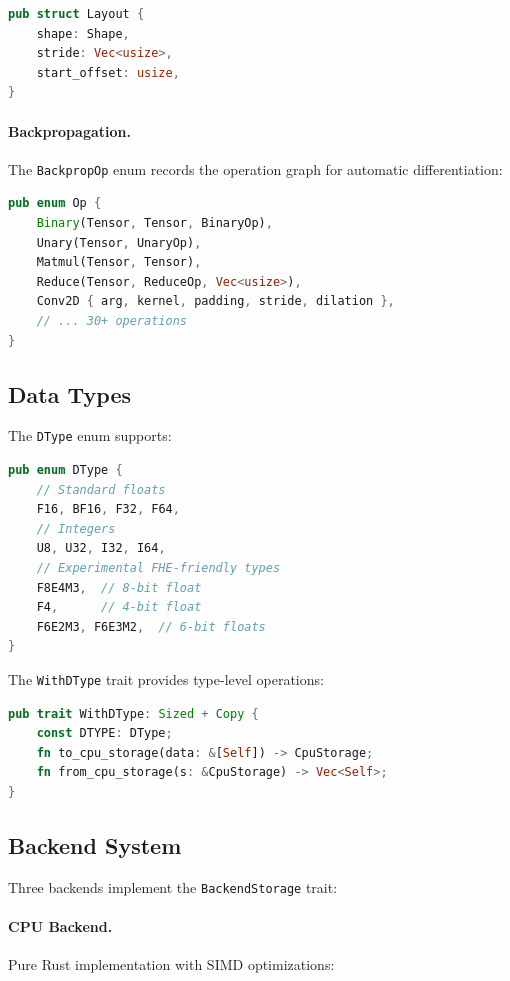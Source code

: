 \begin{lstlisting}[language=Rust]
pub struct Layout {
    shape: Shape,
    stride: Vec<usize>,
    start_offset: usize,
}
\end{lstlisting}

\paragraph{Backpropagation.} The \texttt{BackpropOp} enum records the operation graph for automatic differentiation:

\begin{lstlisting}[language=Rust]
pub enum Op {
    Binary(Tensor, Tensor, BinaryOp),
    Unary(Tensor, UnaryOp),
    Matmul(Tensor, Tensor),
    Reduce(Tensor, ReduceOp, Vec<usize>),
    Conv2D { arg, kernel, padding, stride, dilation },
    // ... 30+ operations
}
\end{lstlisting}

\subsection{Data Types}

The \texttt{DType} enum supports:

\begin{lstlisting}[language=Rust]
pub enum DType {
    // Standard floats
    F16, BF16, F32, F64,
    // Integers
    U8, U32, I32, I64,
    // Experimental FHE-friendly types
    F8E4M3,  // 8-bit float
    F4,      // 4-bit float
    F6E2M3, F6E3M2,  // 6-bit floats
}
\end{lstlisting}

The \texttt{WithDType} trait provides type-level operations:

\begin{lstlisting}[language=Rust]
pub trait WithDType: Sized + Copy {
    const DTYPE: DType;
    fn to_cpu_storage(data: &[Self]) -> CpuStorage;
    fn from_cpu_storage(s: &CpuStorage) -> Vec<Self>;
}
\end{lstlisting}

\subsection{Backend System}

Three backends implement the \texttt{BackendStorage} trait:

\paragraph{CPU Backend.} Pure Rust implementation with SIMD optimizations:

